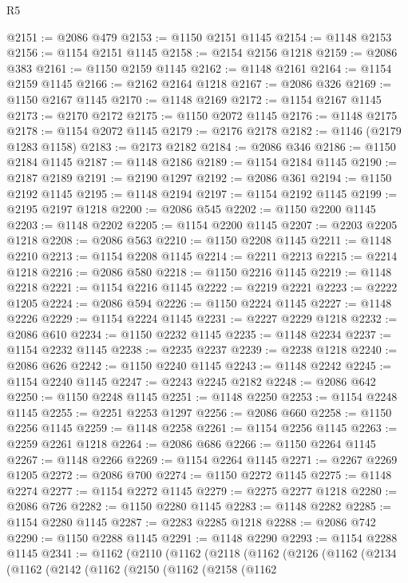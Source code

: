 \begin{lexlean}{R5}
\begin{coremodule}
@2151 := @2086 @479
@2153 := @1150 @2151 @1145
@2154 := @1148 @2153
@2156 := @1154 @2151 @1145
@2158 := @2154 @2156 @1218
@2159 := @2086 @383
@2161 := @1150 @2159 @1145
@2162 := @1148 @2161
@2164 := @1154 @2159 @1145
@2166 := @2162 @2164 @1218
@2167 := @2086 @326
@2169 := @1150 @2167 @1145
@2170 := @1148 @2169
@2172 := @1154 @2167 @1145
@2173 := @2170 @2172
@2175 := @1150 @2072 @1145
@2176 := @1148 @2175
@2178 := @1154 @2072 @1145
@2179 := @2176 @2178
@2182 := @1146 (@2179 @1283 @1158)
@2183 := @2173 @2182
@2184 := @2086 @346
@2186 := @1150 @2184 @1145
@2187 := @1148 @2186
@2189 := @1154 @2184 @1145
@2190 := @2187 @2189
@2191 := @2190 @1297
@2192 := @2086 @361
@2194 := @1150 @2192 @1145
@2195 := @1148 @2194
@2197 := @1154 @2192 @1145
@2199 := @2195 @2197 @1218
@2200 := @2086 @545
@2202 := @1150 @2200 @1145
@2203 := @1148 @2202
@2205 := @1154 @2200 @1145
@2207 := @2203 @2205 @1218
@2208 := @2086 @563
@2210 := @1150 @2208 @1145
@2211 := @1148 @2210
@2213 := @1154 @2208 @1145
@2214 := @2211 @2213
@2215 := @2214 @1218
@2216 := @2086 @580
@2218 := @1150 @2216 @1145
@2219 := @1148 @2218
@2221 := @1154 @2216 @1145
@2222 := @2219 @2221
@2223 := @2222 @1205
@2224 := @2086 @594
@2226 := @1150 @2224 @1145
@2227 := @1148 @2226
@2229 := @1154 @2224 @1145
@2231 := @2227 @2229 @1218
@2232 := @2086 @610
@2234 := @1150 @2232 @1145
@2235 := @1148 @2234
@2237 := @1154 @2232 @1145
@2238 := @2235 @2237
@2239 := @2238 @1218
@2240 := @2086 @626
@2242 := @1150 @2240 @1145
@2243 := @1148 @2242
@2245 := @1154 @2240 @1145
@2247 := @2243 @2245 @2182
@2248 := @2086 @642
@2250 := @1150 @2248 @1145
@2251 := @1148 @2250
@2253 := @1154 @2248 @1145
@2255 := @2251 @2253 @1297
@2256 := @2086 @660
@2258 := @1150 @2256 @1145
@2259 := @1148 @2258
@2261 := @1154 @2256 @1145
@2263 := @2259 @2261 @1218
@2264 := @2086 @686
@2266 := @1150 @2264 @1145
@2267 := @1148 @2266
@2269 := @1154 @2264 @1145
@2271 := @2267 @2269 @1205
@2272 := @2086 @700
@2274 := @1150 @2272 @1145
@2275 := @1148 @2274
@2277 := @1154 @2272 @1145
@2279 := @2275 @2277 @1218
@2280 := @2086 @726
@2282 := @1150 @2280 @1145
@2283 := @1148 @2282
@2285 := @1154 @2280 @1145
@2287 := @2283 @2285 @1218
@2288 := @2086 @742
@2290 := @1150 @2288 @1145
@2291 := @1148 @2290
@2293 := @1154 @2288 @1145
@2341 := @1162
    (@2110
      (@1162
        (@2118
          (@1162
            (@2126
              (@1162
                (@2134
                  (@1162
                    (@2142
                      (@1162
                        (@2150
                          (@1162
                            (@2158
                              (@1162

\end{coremodule}
\end{lexlean}
